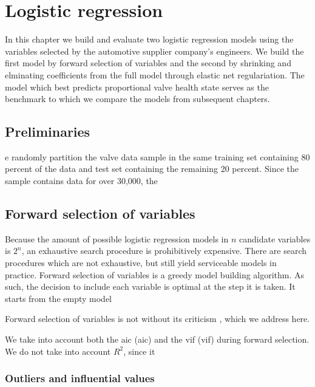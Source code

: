 \chapter{Logistic regression}

In this chapter we build and evaluate two logistic regression models using the variables selected by the automotive supplier company's engineers.
We build the first model by forward selection of variables and the second by shrinking and elminating coefficients from the full model through elastic net regulariation.
The model which best predicts proportional valve health state serves as the benchmark to which we compare the models from subsequent chapters.

\section{Preliminaries}

e randomly partition the valve data sample in the same training set containing 80 percent of the data and test set containing the remaining 20 percent.
Since the sample contains data for over 30,000, the

\section{Forward selection of variables}

Because the amount of possible logistic regression models in $n$ candidate variables is $2^n$, an exhaustive search procedure is prohibitively expensive.
There are search procedures which are not exhaustive, but still yield serviceable models in practice.
Forward selection of variables is a greedy model building algorithm.
As such, the decision to include each variable is optimal at the step it is taken.
It starts from the empty model

Forward selection of variables is not without its criticism \citep{doi:10.1080/00401706.1970.10488701,doi:10.1080/00031305.1990.10475722}, which we address here.

We take into account both the \acrlong{aic} (\acrshort{aic}) \citep{Akaike1998} and the \acrlong{vif} (\acrshort{vif}) during forward selection.
We do not take into account $R^{2}$, since it

\subsection{Outliers and influential values}

